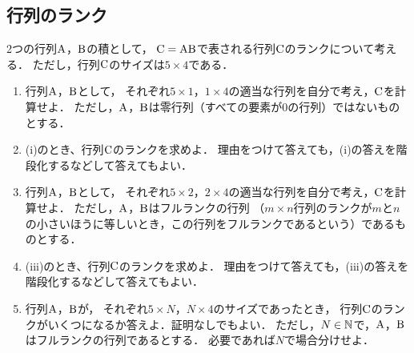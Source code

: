 \clearpage
\subsection{行列のランク}
  2つの行列$\mathrm{A}$，$\mathrm{B}$の積として，
  $\mathrm{C}=\mathrm{A}\mathrm{B}$で表される行列$\mathrm{C}$のランクについて考える．
  ただし，行列$\mathrm{C}$のサイズは$5\times 4$である．

  \begin{enumerate}[label=(\roman*)]
    \item 行列$\mathrm{A}$，$\mathrm{B}$として，
      それぞれ$5\times 1$，$1\times 4$の適当な行列を自分で考え，$\mathrm{C}$を計算せよ．
      ただし，$\mathrm{A}$，$\mathrm{B}$は零行列（すべての要素が0の行列）ではないものとする．
    \item (i)のとき、行列$\mathrm{C}$のランクを求めよ．
      理由をつけて答えても，(i)の答えを階段化するなどして答えてもよい．
    \item 行列$\mathrm{A}$，$\mathrm{B}$として，
      それぞれ$5\times 2$，$2\times 4$の適当な行列を自分で考え，$\mathrm{C}$を計算せよ．
      ただし，$\mathrm{A}$，$\mathrm{B}$はフルランクの行列
      （$m\times n$行列のランクが$m$と$n$の小さいほうに等しいとき，この行列をフルランクであるという）であるものとする．
    \item (iii)のとき、行列$\mathrm{C}$のランクを求めよ．
      理由をつけて答えても，(iii)の答えを階段化するなどして答えてもよい．
    \item 行列$\mathrm{A}$，$\mathrm{B}$が，
      それぞれ$5\times N$，$N\times 4$のサイズであったとき，
      行列$\mathrm{C}$のランクがいくつになるか答えよ．証明なしでもよい．
      ただし，$N\in \mathbb{N}$で，$\mathrm{A}$，$\mathrm{B}$はフルランクの行列であるとする．
      必要であれば$N$で場合分けせよ．
  \end{enumerate}

